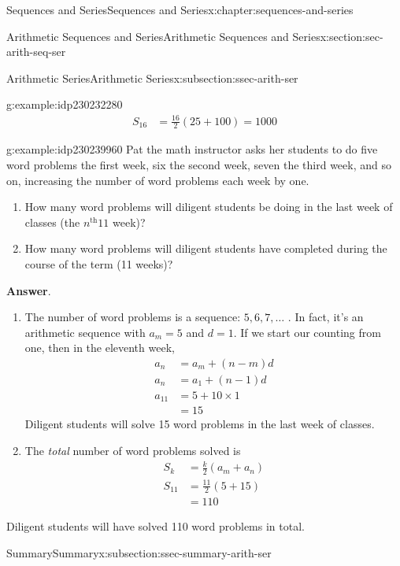 \documentclass[twoside,10pt,]{book}
\newcommand{\blocktitlefont}{\relax}
\numberwithin{equation}{section}
\newcommand{\nth}{{n^{\text{th}}}}
\newcommand{\amp}{&}
\begin{document}
\begin{chapterptx}{Sequences and Series}{}{Sequences and Series}{}{}{x:chapter:sequences-and-series}
\begin{sectionptx}{Arithmetic Sequences and Series}{}{Arithmetic Sequences and Series}{}{}{x:section:sec-arith-seq-ser}
\begin{subsectionptx}{Arithmetic Series}{}{Arithmetic Series}{}{}{x:subsection:ssec-arith-ser}
\begin{example}{}{g:example:idp230232280}
\begin{align*}
S_{16} \amp = \frac{16}{2}\left(25 + 100 \right) = 1000
\end{align*}
%
\end{example}
 \begin{example}{}{g:example:idp230239960}%
Pat the math instructor asks her students to do five word problems the first week, six the second week, seven the third week, and so on, increasing the number of word problems each week by one. %
\begin{enumerate}[label=(\alph*)]
\item{}How many word problems will diligent students be doing in the last week of classes (the \(\nth{11}\) week)?%
\item{}How many word problems will diligent students have completed during the course of the term (11 weeks)?%
\end{enumerate}
\par\smallskip%
\noindent\textbf{\blocktitlefont Answer}.\label{g:answer:idp230235608}{}\hypertarget{g:answer:idp230235608}{}\quad{}%
\begin{enumerate}[label=(\alph*)]
\item{}The number of word problems is a sequence:  \(5, 6, 7, \ldots\) .  In fact, it's an arithmetic sequence with \(a_m = 5\) and \(d = 1\).  If we start our counting from one, then in the eleventh week,%
\begin{align*}
a_n \amp = a_m + \left(n - m \right)d\\
a_n \amp = a_1+\left(n-1\right)d\\
a_{11} \amp = 5+10\times 1\\
\amp = 15
\end{align*}
Diligent students will solve 15 word problems in the last week of classes.%
\item{}The \emph{total} number of word problems solved is%
\begin{align*}
S_k \amp = \frac{k}{2}\left(a_m + a_n \right)\\
S_{11} \amp = \frac{11}{2}\left(5 + 15\right)\\
\amp = 110
\end{align*}
%
\end{enumerate}
 Diligent students will have solved 110 word problems in total.\end{example}
%
\end{subsectionptx}
%
%
\typeout{************************************************}
\typeout{************************************************}
%
\begin{subsectionptx}{Summary}{}{Summary}{}{}{x:subsection:ssec-summary-arith-ser}

\end{subsectionptx}
\end{sectionptx}
\end{chapterptx}
\end{document}
